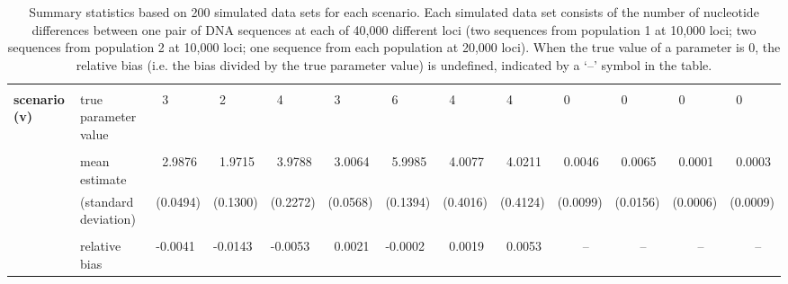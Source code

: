 \documentclass[11pt]{article}
\begin{document}
\begin{sidewaystable}[!p]
\begin{center}
{\begin{tabular}{|l|l|lllllllllll|}
 \\ \hline \vspace*{-2mm} & & & & & & & & & & & & \\
 {\bf scenario (v)} & true parameter value & ~3 & ~2 & ~4 & ~3 & ~6 & ~4 & ~4 & ~0 & ~0 & ~0 & ~0 
\\ \vspace*{-2mm} & & & & & & & & & & & & \\ 
& mean estimate & ~2.9876 & ~1.9715 & ~3.9788 & ~3.0064 & ~5.9985 & ~4.0077 & ~4.0211 & ~0.0046 & ~0.0065 & ~0.0001 & ~0.0003 \\
& (standard deviation) & (0.0494) & (0.1300) & (0.2272) & (0.0568) & (0.1394) & (0.4016) & (0.4124) & (0.0099) & (0.0156) & (0.0006) & (0.0009)
\\ \vspace*{-2mm} & & & & & & & & & & & & \\
& relative bias & -0.0041 & -0.0143 & -0.0053 & ~0.0021 & -0.0002 & ~0.0019 & ~0.0053 & ~~~~-- & ~~~~-- & ~~~~-- & ~~~~-- 
\\ \hline
\end{tabular}}
\end{center}
\caption*{Summary statistics based on 200 simulated data sets for each scenario. Each simulated data set consists of the number of nucleotide differences between one pair of DNA sequences at each of 40,000 different loci (two sequences from population 1 at 10,000 loci; two sequences from population 2 at 10,000 loci; one sequence from each population at 20,000 loci). When the true value of a parameter is $0$, the relative bias (i.e. the bias divided by the true parameter value) is undefined, indicated by a `--' symbol in the table.}  
\end{sidewaystable}
\end{document}
